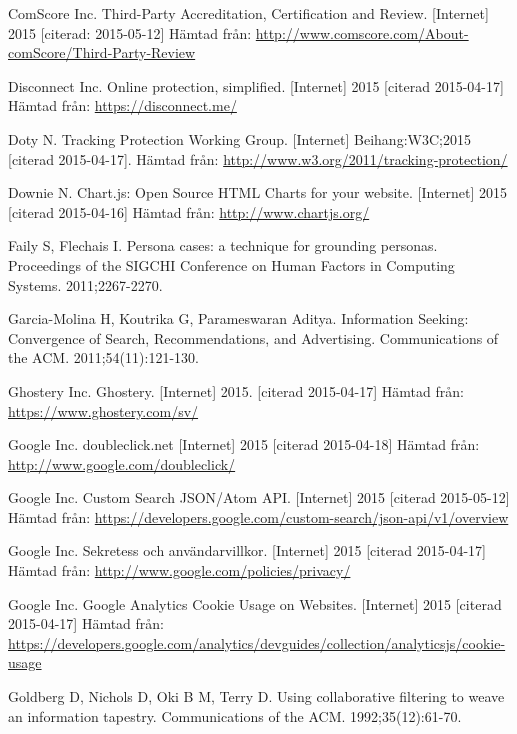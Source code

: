 \documentclass[a4paper,11pt]{article}
\begin{document}
{\begin{thebibliography}{888}
 ComScore Inc. Third-Party Accreditation, Certification and Review. [Internet] 2015 [citerad: 2015-05-12] Hämtad från: \url{http://www.comscore.com/About-comScore/Third-Party-Review}

 Disconnect Inc. Online protection, simplified. [Internet] 2015 [citerad 2015-04-17] Hämtad från: \url{https://disconnect.me/}

 Doty N. Tracking Protection Working Group. [Internet] Beihang:W3C;2015 [citerad 2015-04-17]. Hämtad från: \url{http://www.w3.org/2011/tracking-protection/}

Downie N. Chart.js: Open Source HTML Charts for your website. [Internet] 2015 [citerad 2015-04-16] Hämtad från: \url{http://www.chartjs.org/}

Faily S, Flechais I. Persona cases: a technique for grounding personas. Proceedings of the SIGCHI Conference on Human Factors in Computing Systems. 2011;2267-2270.

Garcia-Molina H, Koutrika G, Parameswaran Aditya. Information Seeking: Convergence of Search, Recommendations, and Advertising. Communications of the ACM. 2011;54(11):121-130.

Ghostery Inc. Ghostery. [Internet] 2015. [citerad 2015-04-17] Hämtad från: \url{https://www.ghostery.com/sv/}

 Google Inc. doubleclick.net [Internet] 2015 [citerad 2015-04-18] Hämtad från: \url{http://www.google.com/doubleclick/}

 Google Inc. Custom Search JSON/Atom API. [Internet] 2015 [citerad 2015-05-12] Hämtad från: \url{https://developers.google.com/custom-search/json-api/v1/overview}

Google Inc. Sekretess och användarvillkor. [Internet] 2015 [citerad 2015-04-17] Hämtad från: \url{http://www.google.com/policies/privacy/}

Google Inc. Google Analytics Cookie Usage on Websites. [Internet] 2015 [citerad 2015-04-17] Hämtad från: \url{https://developers.google.com/analytics/devguides/collection/analyticsjs/cookie-usage}

Goldberg D, Nichols D, Oki B M, Terry D. Using collaborative filtering to weave an information tapestry. Communications of the ACM. 1992;35(12):61-70.


\end{thebibliography}}
\end{document}
